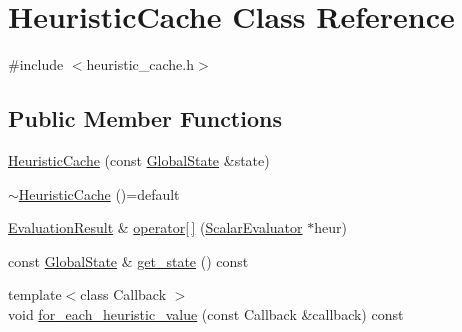 \hypertarget{classHeuristicCache}{\section{Heuristic\-Cache Class Reference}
\label{classHeuristicCache}
}


{\ttfamily \#include $<$heuristic\-\_\-cache.\-h$>$}

\subsection*{Public Member Functions}
\begin{DoxyCompactItemize}
\item 
\hyperlink{classHeuristicCache_ad4586b89f8d90338395ce5a0a2e1f5ca}{Heuristic\-Cache} (const \hyperlink{classGlobalState}{Global\-State} \&state)
\item 
\hyperlink{classHeuristicCache_a640010334ec9c5e72aacb0d935c21623}{$\sim$\-Heuristic\-Cache} ()=default
\item 
\hyperlink{classEvaluationResult}{Evaluation\-Result} \& \hyperlink{classHeuristicCache_a6f886c2549970b8f67642e0402b7ff72}{operator\mbox{[}$\,$\mbox{]}} (\hyperlink{classScalarEvaluator}{Scalar\-Evaluator} $\ast$heur)
\item 
const \hyperlink{classGlobalState}{Global\-State} \& \hyperlink{classHeuristicCache_a4ab89780c4e52e0dd570db752091f3af}{get\-\_\-state} () const 
\item 
{\footnotesize template$<$class Callback $>$ }\\void \hyperlink{classHeuristicCache_a868bc67ecfc8c58b4828783dcc03f7cc}{for\-\_\-each\-\_\-heuristic\-\_\-value} (const Callback \&callback) const 
\end{DoxyCompactItemize}


